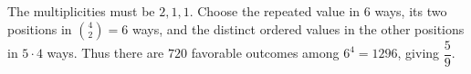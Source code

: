 The multiplicities must be $2,1,1$. Choose the repeated value in $6$ ways, its two positions in $\binom42=6$ ways, and the distinct ordered values in the other positions in $5\cdot4$ ways. Thus there are $720$ favorable outcomes among $6^4=1296$, giving $\boxed{\dfrac{5}{9}}$.
